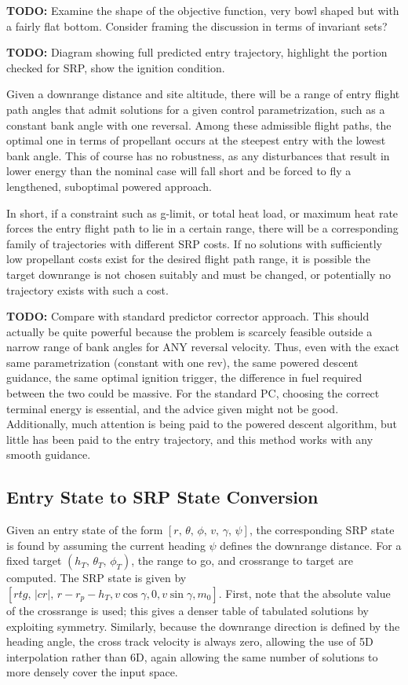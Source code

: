 \documentclass[]{article}
\begin{document}
\textbf{TODO:} Examine the shape of the objective function, very bowl shaped but with a fairly flat bottom. Consider framing the discussion in terms of invariant sets? 

\textbf{TODO:} Diagram showing full predicted entry trajectory, highlight the portion checked for SRP, show the ignition condition.

Given a downrange distance and site altitude, there will be a range of entry flight path angles that admit solutions for a given control parametrization, such as a constant bank angle with one reversal. Among these admissible flight paths, the optimal one in terms of propellant occurs at the steepest entry with the lowest bank angle. This of course has no robustness, as any disturbances that result in lower energy than the nominal case will fall short and be forced to fly a lengthened, suboptimal powered approach. 

In short, if a constraint such as g-limit, or total heat load, or maximum heat rate forces the entry flight path to lie in a certain range, there will be a corresponding family of trajectories with different SRP costs. If no solutions with sufficiently low propellant costs exist for the desired flight path range, it is possible the target downrange is not chosen suitably and must be changed, or potentially no trajectory exists with such a cost. 

\textbf{TODO:} Compare with standard predictor corrector approach. This should actually be quite powerful because the problem is scarcely feasible outside a narrow range of bank angles for ANY reversal velocity. Thus, even with the exact same parametrization (constant with one rev), the same powered descent guidance, the same optimal ignition trigger, the difference in fuel required between the two could be massive. For the standard PC, choosing the correct terminal energy is essential, and the advice given might not be good. Additionally, much attention is being paid to the powered descent algorithm, but little has been paid to the entry trajectory, and this method works with any smooth guidance.

\subsection{Entry State to SRP State Conversion}
Given an entry state of the form $[r,\, \theta,\, \phi,\, v,\, \gamma,\, \psi]$, the corresponding SRP state is found by assuming the current heading $\psi$ defines the downrange distance. For a fixed target $(h_T,\, \theta_T,\, \phi_T)$, the range to go, and crossrange to target are computed. The SRP state is given by $[rtg,\, |cr|,\, r-r_p-h_T, v\cos\gamma, 0, v\sin\gamma, m_0]$. First, note that the absolute value of the crossrange is used; this gives a denser table of tabulated solutions by exploiting symmetry. Similarly, because the downrange direction is defined by the heading angle, the cross track velocity is always zero, allowing the use of 5D interpolation rather than 6D, again allowing the same number of solutions to more densely cover the input space. 
\end{document}
